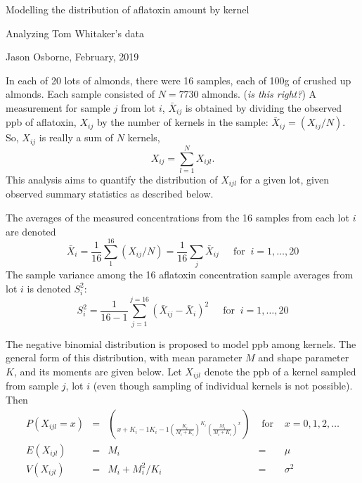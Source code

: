 \documentclass{article}
\begin{document}
\centerline{Modelling the distribution of aflatoxin amount by kernel}
\centerline{Analyzing Tom Whitaker's data}
\centerline{Jason Osborne, February, 2019}
In each of 20 lots of almonds, there were 16 samples, each of 100g of crushed 
up almonds.  Each sample consisted of $N=7730$ almonds.  ({\em is this right?})
A measurement for sample $j$ from lot $i$, $\bar{X}_{ij}$ is obtained by 
dividing the observed ppb of aflatoxin, $X_{ij}$ by the number of kernels in the 
sample:   $\bar{X}_{ij}=(X_{ij}/N)$.  So, $X_{ij}$ is really a sum of $N$ kernels,
$$X_{ij}=\sum_{l=1}^N X_{ijl}.$$
This analysis aims to quantify the distribution of $X_{ijl}$ for a 
given lot, given observed summary statistics as described below.

The averages of the measured concentrations from the 16 samples from each 
lot $i$ are denoted 
$$\bar{X}_i=\frac{1}{16} \sum_1^{16}(X_{ij}/N) = \frac{1}{16} \sum_j \bar{X}_{ij} \ \ \ \ \ \mbox{ for } \ i=1,\ldots,20$$  
The sample
variance among the 16 aflatoxin concentration sample averages from lot $i$ is denoted $S_i^2$:
$$ S_i^2 = \frac{1}{16-1} \sum_{j=1}^{j=16} (\bar{X}_{ij}-\bar{X}_i)^2\ \ \ \ \ \mbox{ for } \ i=1,\ldots,20$$  


The negative binomial distribution %
is proposed to model ppb among kernels.  The general form of this distribution, with mean parameter $M$ and shape parameter $K$, and its moments are given below.
Let $X_{ijl}$ denote the ppb of a kernel sampled from sample $j$, lot $i$ (even though sampling of individual kernels is not possible).  Then
\[
\begin{array}{ccccc}
P(X_{ijl}=x) &=& \choose{x+K_i-1}{K_i-1}\left(\frac{K_i}{M_i+K_i}\right)^{K_i} \left(\frac{M_i}{M_i+K_i}\right)^x & \mbox{ for } & x=0,1,2,\ldots \\
E(X_{ijl}) &=& M_i & = & \mu\\
V(X_{ijl}) &=& M_i + M_i^2/K_i & = & \sigma^2
\end{array}
\]
\end{document}
